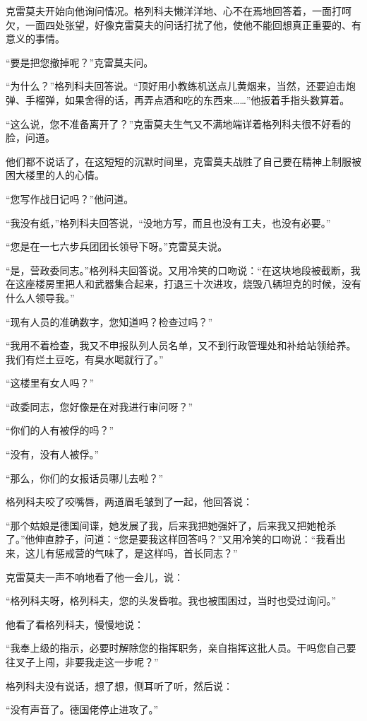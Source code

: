 克雷莫夫开始向他询问情况。格列科夫懒洋洋地、心不在焉地回答着，一面打呵欠，一面四处张望，好像克雷莫夫的问话打扰了他，使他不能回想真正重要的、有意义的事情。

“要是把您撤掉呢？”克雷莫夫问。

“为什么？”格列科夫回答说。“顶好用小教练机送点儿黄烟来，当然，还要迫击炮弹、手榴弹，如果舍得的话，再弄点酒和吃的东西来……”他扳着手指头数算着。

“这么说，您不准备离开了？”克雷莫夫生气又不满地端详着格列科夫很不好看的脸，问道。

他们都不说话了，在这短短的沉默时间里，克雷莫夫战胜了自己要在精神上制服被困大楼里的人的心情。

“您写作战日记吗？”他问道。

“我没有纸，”格列科夫回答说，“没地方写，而且也没有工夫，也没有必要。”

“您是在一七六步兵团团长领导下呀。”克雷莫夫说。

“是，营政委同志。”格列科夫回答说。又用冷笑的口吻说：“在这块地段被截断，我在这座楼房里把人和武器集合起来，打退三十次进攻，烧毁八辆坦克的时候，没有什么人领导我。”

“现有人员的准确数字，您知道吗？检查过吗？”

“我用不着检查，我又不申报队列人员名单，又不到行政管理处和补给站领给养。我们有烂土豆吃，有臭水喝就行了。”

“这楼里有女人吗？”

“政委同志，您好像是在对我进行审问呀？”

“你们的人有被俘的吗？”

“没有，没有人被俘。”

“那么，你们的女报话员哪儿去啦？”

格列科夫咬了咬嘴唇，两道眉毛皱到了一起，他回答说：

“那个姑娘是德国间谍，她发展了我，后来我把她强奸了，后来我又把她枪杀了。”他伸直脖子，问道：“您是要我这样回答吗？”又用冷笑的口吻说：“我看出来，这儿有惩戒营的气味了，是这样吗，首长同志？”

克雷莫夫一声不响地看了他一会儿，说：

“格列科夫呀，格列科夫，您的头发昏啦。我也被围困过，当时也受过询问。”

他看了看格列科夫，慢慢地说：

“我奉上级的指示，必要时解除您的指挥职务，亲自指挥这批人员。干吗您自己要往叉子上闯，非要我走这一步呢？”

格列科夫没有说话，想了想，侧耳听了听，然后说：

“没有声音了。德国佬停止进攻了。”

